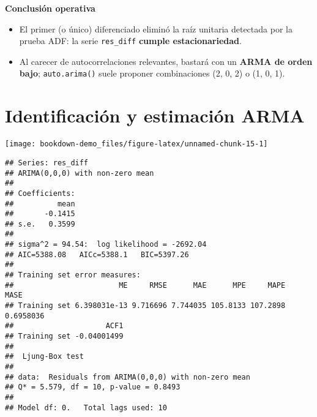 \documentclass[
  11pt,
]{book}
\newenvironment{Shaded}{\begin{snugshade}}{\end{snugshade}}
\newcommand{\AttributeTok}[1]{\textcolor[rgb]{0.13,0.29,0.53}{#1}}
\newcommand{\ConstantTok}[1]{\textcolor[rgb]{0.56,0.35,0.01}{#1}}
\newcommand{\DecValTok}[1]{\textcolor[rgb]{0.00,0.00,0.81}{#1}}
\newcommand{\FunctionTok}[1]{\textcolor[rgb]{0.13,0.29,0.53}{\textbf{#1}}}
\newcommand{\NormalTok}[1]{#1}
\newcommand{\OtherTok}[1]{\textcolor[rgb]{0.56,0.35,0.01}{#1}}
\newcommand{\SpecialCharTok}[1]{\textcolor[rgb]{0.81,0.36,0.00}{\textbf{#1}}}
\providecommand{\tightlist}{%
  \setlength{\itemsep}{0pt}\setlength{\parskip}{0pt}}
\begin{document}
\textbf{Conclusión operativa}

\begin{itemize}
\tightlist
\item
  El primer (o único) diferenciado eliminó la raíz unitaria detectada por
  la prueba ADF: la serie \texttt{res\_diff} \textbf{cumple estacionariedad}.\\
\item
  Al carecer de autocorrelaciones relevantes, bastará con un \textbf{ARMA de
  orden bajo}; \texttt{auto.arima()} suele proponer combinaciones (2, 0, 2) o
  (1, 0, 1).
\end{itemize}

\section{Identificación y estimación ARMA}\label{identificaciuxf3n-y-estimaciuxf3n-arma}

\begin{Shaded}
\end{Shaded}

\begin{center}\texttt{[image: bookdown-demo\_files/figure-latex/unnamed-chunk-15-1]} \end{center}

\begin{verbatim}
## Series: res_diff 
## ARIMA(0,0,0) with non-zero mean 
## 
## Coefficients:
##          mean
##       -0.1415
## s.e.   0.3599
## 
## sigma^2 = 94.54:  log likelihood = -2692.04
## AIC=5388.08   AICc=5388.1   BIC=5397.26
## 
## Training set error measures:
##                        ME     RMSE      MAE      MPE     MAPE      MASE
## Training set 6.398031e-13 9.716696 7.744035 105.8133 107.2898 0.6958036
##                     ACF1
## Training set -0.04001499
## 
##  Ljung-Box test
## 
## data:  Residuals from ARIMA(0,0,0) with non-zero mean
## Q* = 5.579, df = 10, p-value = 0.8493
## 
## Model df: 0.   Total lags used: 10
\end{verbatim}
\end{document}
